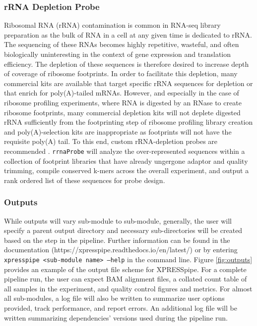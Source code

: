 \documentclass[11pt, a4paper, oneside]{article}
\begin{document}
\subsubsection{rRNA Depletion Probe}
Ribosomal RNA (rRNA) contamination is common in RNA-seq library preparation as the bulk of RNA in a cell at any given time is dedicated to rRNA. The sequencing of these RNAs becomes highly repetitive, wasteful, and often biologically uninteresting in the context of gene expression and translation efficiency. The depletion of these sequences is therefore desired to increase depth of coverage of ribosome footprints. In order to facilitate this depletion, many commercial kits are available that target specific rRNA sequences for depletion or that enrich for poly(A)-tailed mRNAs. However, and especially in the case of ribosome profiling experiments, where RNA is digested by an RNase to create ribosome footprints, many commercial depletion kits will not deplete digested rRNA sufficiently from the footprinting step of ribosome profiling library creation and poly(A)-selection kits are inappropriate as footprints will not have the requisite poly(A) tail. To this end, custom rRNA-depletion probes are recommended \cite{ingolia_meth, ingolia_science}. \texttt{rrnaProbe} will analyze the over-represented sequences within a collection of footprint libraries that have already ungergone adaptor and quality trimming, compile conserved k-mers across the overall experiment, and output a rank ordered list of these sequences for probe design.


\subsubsection{Outputs}
While outputs will vary sub-module to sub-module, generally, the user will specify a parent output directory and necessary sub-directories will be created based on the step in the pipeline. Further information can be found in the documentation (https://xpresspipe.readthedocs.io/en/latest/) or by entering \texttt{xpresspipe \textless sub-module name\textgreater \ --help} in the command line. Figure \ref{fig:outputs} provides an example of the output file scheme for XPRESSpipe. For a complete pipeline run, the user can expect BAM alignment files, a collated count table of all samples in the experiment, and quality control figures and metrics. For almost all sub-modules, a log file will also be written to summarize user options provided, track performance, and report errors. An additional log file will be written summarizing dependencies' versions used during the pipeline run.
\end{document}
